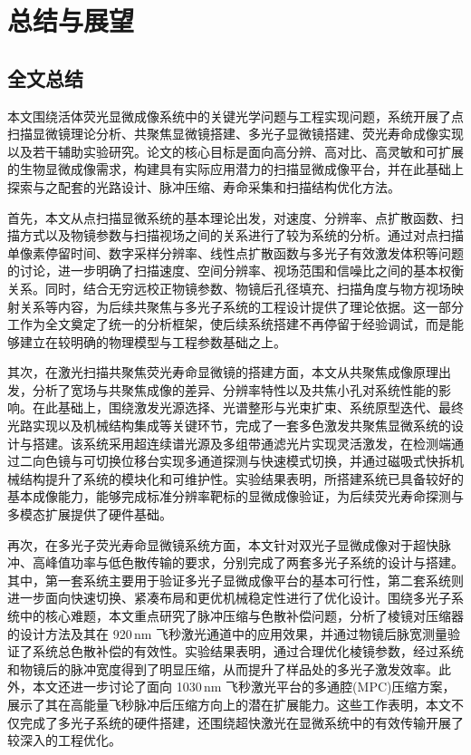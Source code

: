 \chapter{总结与展望}\label{Chap:7}

\section{全文总结}\label{7.1}

本文围绕活体荧光显微成像系统中的关键光学问题与工程实现问题，系统开展了点扫描显微镜理论分析、共聚焦显微镜搭建、多光子显微镜搭建、荧光寿命成像实现以及若干辅助实验研究。论文的核心目标是面向高分辨、高对比、高灵敏和可扩展的生物显微成像需求，构建具有实际应用潜力的扫描显微成像平台，并在此基础上探索与之配套的光路设计、脉冲压缩、寿命采集和扫描结构优化方法。

首先，本文从点扫描显微系统的基本理论出发，对速度、分辨率、点扩散函数、扫描方式以及物镜参数与扫描视场之间的关系进行了较为系统的分析。通过对点扫描单像素停留时间、数字采样分辨率、线性点扩散函数与多光子有效激发体积等问题的讨论，进一步明确了扫描速度、空间分辨率、视场范围和信噪比之间的基本权衡关系。同时，结合无穷远校正物镜参数、物镜后孔径填充、扫描角度与物方视场映射关系等内容，为后续共聚焦与多光子系统的工程设计提供了理论依据。这一部分工作为全文奠定了统一的分析框架，使后续系统搭建不再停留于经验调试，而是能够建立在较明确的物理模型与工程参数基础之上。

其次，在激光扫描共聚焦荧光寿命显微镜的搭建方面，本文从共聚焦成像原理出发，分析了宽场与共聚焦成像的差异、分辨率特性以及共焦小孔对系统性能的影响。在此基础上，围绕激发光源选择、光谱整形与光束扩束、系统原型迭代、最终光路实现以及机械结构集成等关键环节，完成了一套多色激发共聚焦显微系统的设计与搭建。该系统采用超连续谱光源及多组带通滤光片实现灵活激发，在检测端通过二向色镜与可切换位移台实现多通道探测与快速模式切换，并通过磁吸式快拆机械结构提升了系统的模块化和可维护性。实验结果表明，所搭建系统已具备较好的基本成像能力，能够完成标准分辨率靶标的显微成像验证，为后续荧光寿命探测与多模态扩展提供了硬件基础。

再次，在多光子荧光寿命显微镜系统方面，本文针对双光子显微成像对于超快脉冲、高峰值功率与低色散传输的要求，分别完成了两套多光子系统的设计与搭建。其中，第一套系统主要用于验证多光子显微成像平台的基本可行性，第二套系统则进一步面向快速切换、紧凑布局和更优机械稳定性进行了优化设计。围绕多光子系统中的核心难题，本文重点研究了脉冲压缩与色散补偿问题，分析了棱镜对压缩器的设计方法及其在 920\,nm 飞秒激光通道中的应用效果，并通过物镜后脉宽测量验证了系统总色散补偿的有效性。实验结果表明，通过合理优化棱镜参数，经过系统和物镜后的脉冲宽度得到了明显压缩，从而提升了样品处的多光子激发效率。此外，本文还进一步讨论了面向 1030\,nm 飞秒激光平台的多通腔(MPC)压缩方案，展示了其在高能量飞秒脉冲后压缩方向上的潜在扩展能力。这些工作表明，本文不仅完成了多光子系统的硬件搭建，还围绕超快激光在显微系统中的有效传输开展了较深入的工程优化。

